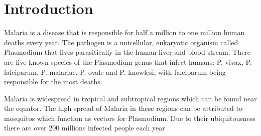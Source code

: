 \section{Introduction}
Malaria is a disease that is responsible for half a million to one million human deaths every year. The pathogen is a unicellular, eukaryotic organism called Plasmodium that lives parasitically in the human liver and blood stream. There are five known species of the Plasmodium genus that infect humans: P. vivax, P. falciparum, P. malariae, P. ovale and P. knowlesi, with falciparum being responsible for the most deaths. 

Malaria is widespread in tropical and subtropical regions which can be found near the equator. The high spread of Malaria in these regions can be attributed to mosquitos which function as vectors for Plasmodium. Due to their ubiquitousness there are over 200 millions infected people each year